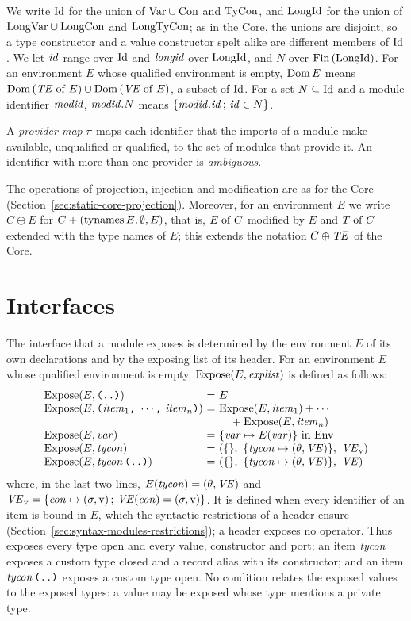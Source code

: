 We write $\mathrm{Id}$ for the union of $\mathrm{Var} \cup \mathrm{Con}$ and
$\mathrm{TyCon}$, and $\mathrm{LongId}$ for the union of $\mathrm{LongVar} \cup
\mathrm{LongCon}$ and $\mathrm{LongTyCon}$; as in the Core, the unions are disjoint,
so a type constructor and a value constructor spelt alike are different members
of $\mathrm{Id}$. We let $\mathit{id}$ range over $\mathrm{Id}$ and $\mathit{longid}$ over $\mathrm{LongId}$,
and $N$ over $\mathrm{Fin}\,(\mathrm{LongId})$. For an environment $E$ whose qualified
environment is empty, $\mathrm{Dom}\, E$ means $\mathrm{Dom}\,(\mathit{TE} \mathrel{\mathrm{of}} E) \cup \mathrm{Dom}\,(\mathit{VE} \mathrel{\mathrm{of}} E)$, a
subset of $\mathrm{Id}$. For a set $N \subseteq \mathrm{Id}$ and a module identifier
$\mathit{modid}$, $\mathit{modid}.N$ means $\{\mathit{modid}.\mathit{id} \,;\, \mathit{id} \in N\}$.

A \emph{provider map} $\pi$ maps each identifier that the imports of a module
make available, unqualified or qualified, to the set of modules that provide
it. An identifier with more than one provider is \emph{ambiguous}.

The operations of projection, injection and modification are as for the Core
(Section~\ref{sec:static-core-projection}). Moreover, for an environment $E$ we
write $C \oplus E$ for $C + (\mathrm{tynames}\, E, \emptyset, E)$, that is, $E \mathrel{\mathrm{of}} C$
modified by $E$ and $T \mathrel{\mathrm{of}} C$ extended with the type names of $E$; this
extends the notation $C \oplus \mathit{TE}$ of the Core.

\section{Interfaces}\label{sec:static-modules-interfaces}

The interface that a module exposes is determined by the environment $E$ of
its own declarations and by the exposing list of its header. For an
environment $E$ whose qualified environment is empty, $\mathrm{Expose}(E, \mathit{explist})$
is defined as follows:
\[
\begin{array}{@{}l@{\ =\ }l@{}}
  \Expose(E, \kw{(..)}) & E\\
  \Expose(E, \kw{(}\expitem_1\kw{,}\ \cdots\kw{,}\ \expitem_n\kw{)})
    & \Expose(E, \expitem_1) + \cdots\\
  \multicolumn{1}{@{}l@{}}{} & \quad{} + \Expose(E, \expitem_n)\\
  \Expose(E, \var) & \{\var \mapsto E(\var)\}\ \text{in}\ \Env\\
  \Expose(E, \tycon) & (\emptymap,\ \{\tycon \mapsto (\theta, \VE)\},\ \VE_{\isv})\\
  \Expose(E, \tycon\,\kw{(..)}) & (\emptymap,\ \{\tycon \mapsto (\theta, \VE)\},\ \VE)
\end{array}
\]
where, in the last two lines, $E(\mathit{tycon}) = (\theta, \mathit{VE})$ and $\mathit{VE}_{\mathrm{v}} =
\{\mathit{con} \mapsto (\sigma, \mathrm{v}) \,;\, \mathit{VE}(\mathit{con}) = (\sigma, \mathrm{v})\}$. It is defined when
every identifier of an item is bound in $E$, which the syntactic restrictions
of a header ensure (Section~\ref{sec:syntax-modules-restrictions}); a header
exposes no operator. Thus  exposes every type open and every value,
constructor and port; an item $\mathit{tycon}$ exposes a custom type closed and a
record alias with its constructor; and an item $\mathit{tycon}\,\textnormal{\texttt{(..)}}$ exposes a
custom type open. No condition relates the exposed values to the exposed
types: a value may be exposed whose type mentions a private type. %


